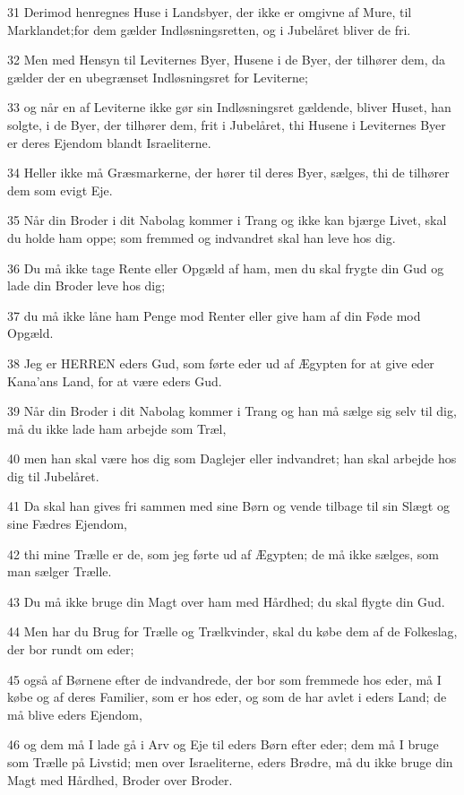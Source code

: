 \par 31 Derimod henregnes Huse i Landsbyer, der ikke er omgivne af Mure, til Marklandet;for dem gælder Indløsningsretten, og i Jubelåret bliver de fri.
\par 32 Men med Hensyn til Leviternes Byer, Husene i de Byer, der tilhører dem, da gælder der en ubegrænset Indløsningsret for Leviterne;
\par 33 og når en af Leviterne ikke gør sin Indløsningsret gældende, bliver Huset, han solgte, i de Byer, der tilhører dem, frit i Jubelåret, thi Husene i Leviternes Byer er deres Ejendom blandt Israeliterne.
\par 34 Heller ikke må Græsmarkerne, der hører til deres Byer, sælges, thi de tilhører dem som evigt Eje.
\par 35 Når din Broder i dit Nabolag kommer i Trang og ikke kan bjærge Livet, skal du holde ham oppe; som fremmed og indvandret skal han leve hos dig.
\par 36 Du må ikke tage Rente eller Opgæld af ham, men du skal frygte din Gud og lade din Broder leve hos dig;
\par 37 du må ikke låne ham Penge mod Renter eller give ham af din Føde mod Opgæld.
\par 38 Jeg er HERREN eders Gud, som førte eder ud af Ægypten for at give eder Kana'ans Land, for at være eders Gud.
\par 39 Når din Broder i dit Nabolag kommer i Trang og han må sælge sig selv til dig, må du ikke lade ham arbejde som Træl,
\par 40 men han skal være hos dig som Daglejer eller indvandret; han skal arbejde hos dig til Jubelåret.
\par 41 Da skal han gives fri sammen med sine Børn og vende tilbage til sin Slægt og sine Fædres Ejendom,
\par 42 thi mine Trælle er de, som jeg førte ud af Ægypten; de må ikke sælges, som man sælger Trælle.
\par 43 Du må ikke bruge din Magt over ham med Hårdhed; du skal flygte din Gud.
\par 44 Men har du Brug for Trælle og Trælkvinder, skal du købe dem af de Folkeslag, der bor rundt om eder;
\par 45 også af Børnene efter de indvandrede, der bor som fremmede hos eder, må I købe og af deres Familier, som er hos eder, og som de har avlet i eders Land; de må blive eders Ejendom,
\par 46 og dem må I lade gå i Arv og Eje til eders Børn efter eder; dem må I bruge som Trælle på Livstid; men over Israeliterne, eders Brødre, må du ikke bruge din Magt med Hårdhed, Broder over Broder.
